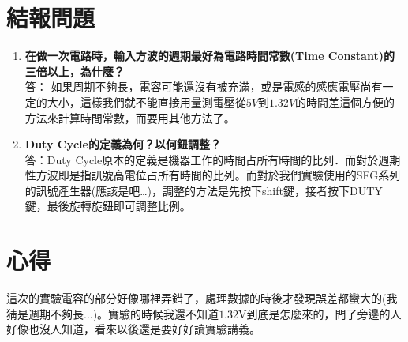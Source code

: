 \documentclass[12pt, a4paper]{article}
\def\large{\fontsize{14}{21}\selectfont}
\begin{document}
\section{結報問題}

\begin{enumerate}[itemsep=20pt, topsep=10pt]
  \item {\large\bf 在做一次電路時，輸入方波的週期最好為電路時間常數(Time Constant)的三倍以上，為什麼？} \\[10pt]
    答： 如果周期不夠長，電容可能還沒有被充滿，或是電感的感應電壓尚有一定的大小，這樣我們就不能直接用量測電壓從$5 \si{V}$到$1.32 \si{V}$的時間差這個方便的方法來計算時間常數，而要用其他方法了。
  \item {\large\bf Duty Cycle的定義為何？以何鈕調整？} \\[10pt]
    答：Duty Cycle原本的定義是機器工作的時間占所有時間的比列．而對於週期性方波即是指訊號高電位占所有時間的比列。而對於我們實驗使用的SFG系列的訊號產生器(應該是吧…)，調整的方法是先按下shift鍵，接者按下DUTY鍵，最後旋轉旋鈕即可調整比例。
\end{enumerate}

\section{心得}
這次的實驗電容的部分好像哪裡弄錯了，處理數據的時後才發現誤差都蠻大的(我猜是週期不夠長...)。實驗的時候我還不知道$1.32\si{\volt}$到底是怎麼來的，問了旁邊的人好像也沒人知道，看來以後還是要好好讀實驗講義。
\end{document}
